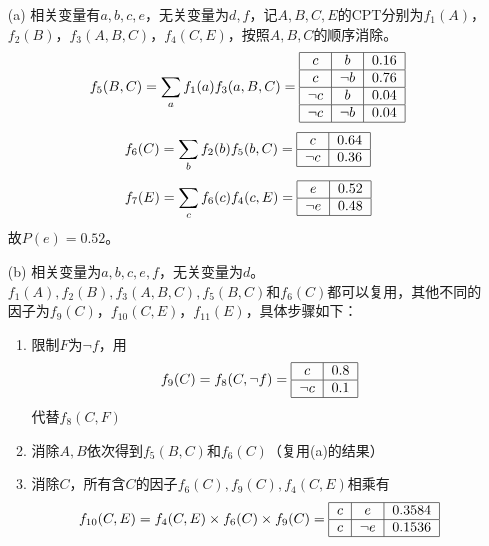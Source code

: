 \documentclass[a4paper, 11pt]{article}
\begin{document}
\begin{answer}
\begin{itemize}
    \item [(a)] 相关变量有$a,b,c,e$，无关变量为$d,f$，记$A,B,C,E$的CPT分别为$f_1(A)$，$f_2(B)$，$f_3(A,B,C)$，$f_4(C,E)$，按照$A,B,C$的顺序消除。
    \[f_5(B,C)=\sum_a f_1(a)f_3(a,B,C)=\text{\begin{tabular}{|c|c|c|}\hline
        $c$ & $b$ & $0.16$\\\hline
        $c$ & $\lnot b$ & $0.76$\\\hline
        $\lnot c$ & $b$ & $0.04$\\\hline
        $\lnot c$ & $\lnot b$ & $0.04$\\\hline
    \end{tabular}}\]
    \[f_6(C)=\sum_b f_2(b)f_5(b,C)=\text{\begin{tabular}{|c|c|}\hline
        $c$ & $0.64$\\\hline
        $\lnot c$ & $0.36$\\\hline
    \end{tabular}}\]
    \[f_7(E)=\sum_c f_6(c)f_4(c,E)=\text{\begin{tabular}{|c|c|}\hline
        $e$ & $0.52$\\\hline
        $\lnot e$ & $0.48$\\\hline
    \end{tabular}}\]
    故$P(e)=0.52$。
    \item [(b)] 相关变量为$a,b,c,e,f$，无关变量为$d$。
    $f_1(A),f_2(B),f_3(A,B,C),f_5(B,C)$和$f_6(C)$都可以复用，其他不同的因子为$f_9(C)$，$f_{10}(C,E)$，$f_{11}(E)$，具体步骤如下：
    \begin{enumerate}
        \item 限制$F$为$\lnot f$，用
        \[f_9(C)=f_8(C,\lnot f)=\text{\begin{tabular}{|c|c|}\hline
            $c$ & $0.8$\\\hline
            $\lnot c$ & $0.1$\\\hline
        \end{tabular}}\]
        代替$f_8(C,F)$
        \item 消除$A,B$依次得到$f_5(B,C)$和$f_6(C)$（复用(a)的结果）
        \item 消除$C$，所有含$C$的因子$f_6(C),f_9(C),f_4(C,E)$相乘有
        \[f_{10}(C,E)=f_4(C,E)\times f_6(C)\times f_9(C)=\text{\begin{tabular}{|c|c|c|}\hline
            $c$ & $e$ & $0.3584$\\\hline
            $c$ & $\lnot e$ & $0.1536$\\\hline

\end{tabular}}\]
\end{enumerate}
\end{itemize}
\end{answer}
\end{document}
